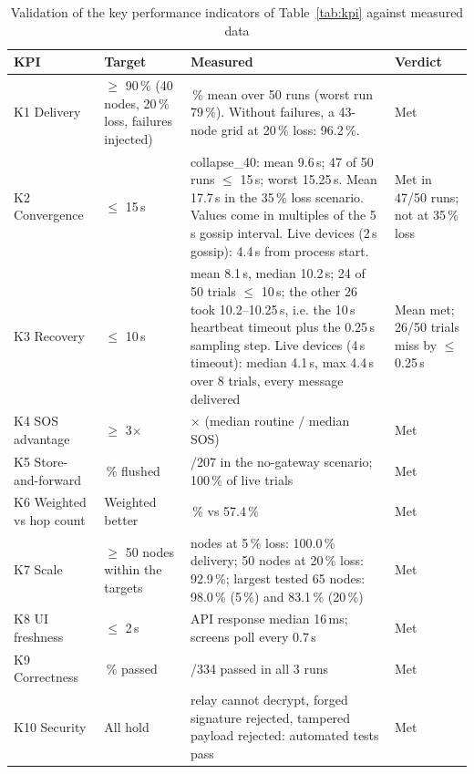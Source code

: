 \begin{table}[htbp]
\caption[Validation of the key performance indicators of Table~\ref{tab:kpi} against measured data]{Validation of the key performance indicators of Table~\ref{tab:kpi} against measured data}
\label{tab:kpival}
\scriptsize
\begin{tabularx}{\textwidth}{@{}>{\raggedright\arraybackslash}p{2.5cm}>{\raggedright\arraybackslash}p{3.0cm}>{\raggedright\arraybackslash}X>{\raggedright\arraybackslash}p{2.3cm}@{}}
\toprule
\textbf{KPI} & \textbf{Target} & \textbf{Measured} & \textbf{Verdict} \\ \midrule
K1 Delivery & $\ge$ 90\,\% (40 nodes, 20\,\% loss, failures injected) & 92.6\,\% mean over 50 runs (worst run 79\,\%). Without failures, a 43-node grid at 20\,\% loss: 96.2\,\%. & Met \\
K2 Convergence & $\le$ 15\,s & collapse\_40: mean 9.6\,s; 47 of 50 runs $\le$ 15\,s; worst 15.25\,s. Mean 17.7\,s in the 35\,\% loss scenario. Values come in multiples of the 5\,s gossip interval. Live devices (2\,s gossip): 4.4\,s from process start. & Met in 47/50 runs; not at 35\,\% loss \\
K3 Recovery & $\le$ 10\,s & mean 8.1\,s, median 10.2\,s; 24 of 50 trials $\le$ 10\,s; the other 26 took 10.2--10.25\,s, i.e. the 10\,s heartbeat timeout plus the 0.25\,s sampling step. Live devices (4\,s timeout): median 4.1\,s, max 4.4\,s over 8 trials, every message delivered & Mean met; 26/50 trials miss by $\le$ 0.25\,s \\
K4 SOS advantage & $\ge$ 3$\times$ & 4.4$\times$ (median routine $/$ median SOS) & Met \\
K5 Store-and-forward & 100\,\% flushed & 207/207 in the no-gateway scenario; 100\,\% of live trials & Met \\
K6 Weighted vs hop count & Weighted better & 99.2\,\% vs 57.4\,\% & Met \\
K7 Scale & $\ge$ 50 nodes within the targets & 50 nodes at 5\,\% loss: 100.0\,\% delivery; 50 nodes at 20\,\% loss: 92.9\,\%; largest tested 65 nodes: 98.0\,\% (5\,\%) and 83.1\,\% (20\,\%) & Met \\
K8 UI freshness & $\le$ 2\,s & API response median 16\,ms; screens poll every 0.7\,s & Met \\
K9 Correctness & 100\,\% passed & 334/334 passed in all 3 runs & Met \\
K10 Security & All hold & relay cannot decrypt, forged signature rejected, tampered payload rejected: automated tests pass & Met \\
\bottomrule
\end{tabularx}
\end{table}
